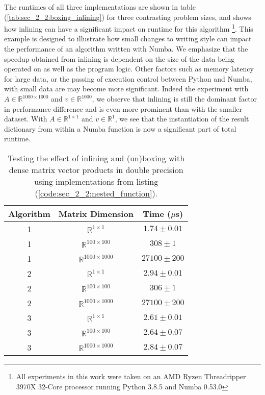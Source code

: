The runtimes of all three implementations are shown in table (\ref{tab:sec_2_2:boxing_inlining}) for three contrasting problem sizes, and shows how inlining can have a significant impact on runtime for this algorithm \footnote{All experiments in this work were taken on an AMD Ryzen Threadripper 3970X 32-Core processor running Python 3.8.5 and Numba 0.53.0}. This example is designed to illustrate how small changes to writing style can impact the performance of an algorithm written with Numba. We emphasize that the speedup obtained from inlining is dependent on the size of the data being operated on as well as the program logic. Other factors such as memory latency for large data, or the passing of execution control between Python and Numba, with small data are may become more significant. Indeed the experiment with $A \in \mathbb{R}^{1000 \times 1000}$ and $v \in \mathbb{R}^{1000}$, we observe that inlining is still the dominant factor in performance difference and is even more prominent than with the smaller dataset. With $A \in \mathbb{R}^{1 \times 1}$ and $v \in \mathbb{R}^1$, we see that the instantiation of the result dictionary from within a Numba function is now a significant part of total runtime.

\begin{table}[h!]
    \centering
    \begin{tabular}{||c c c||} 
        \hline
        Algorithm & Matrix Dimension & Time ($\mu$s) \\ [0.5ex]
        \hline\hline
        1 & $\mathbb{R}^{1 \times 1}$ &       $1.74  \pm 0.01$     \\
        1 & $\mathbb{R}^{100 \times 100}$ &   $308  \pm 1$  \\
        1 & $\mathbb{R}^{1000 \times 1000}$ & $27100 \pm 200$  \\
        \hline
        2 & $\mathbb{R}^{1 \times 1}$ &       $2.94  \pm 0.01$     \\
        2 & $\mathbb{R}^{100 \times 100}$ &   $306   \pm 1$ \\
        2 & $\mathbb{R}^{1000 \times 1000}$ & $27100 \pm 200$\\
        \hline
        3 & $\mathbb{R}^{1 \times 1}$ &        $2.61  \pm 0.01$ \\
        3 & $\mathbb{R}^{100 \times 100}$ &    $2.64  \pm 0.07$ \\
        3 & $\mathbb{R}^{1000 \times 1000}$ &  $2.84  \pm 0.07$  \\
        \hline
    \end{tabular}
    \caption{ Testing the effect of inlining and (un)boxing with dense matrix vector products in double precision using implementations from listing (\ref{code:sec_2_2:nested_function}).}
    \label{table:sec_2_2:boxing_inlining}
\end{table}

